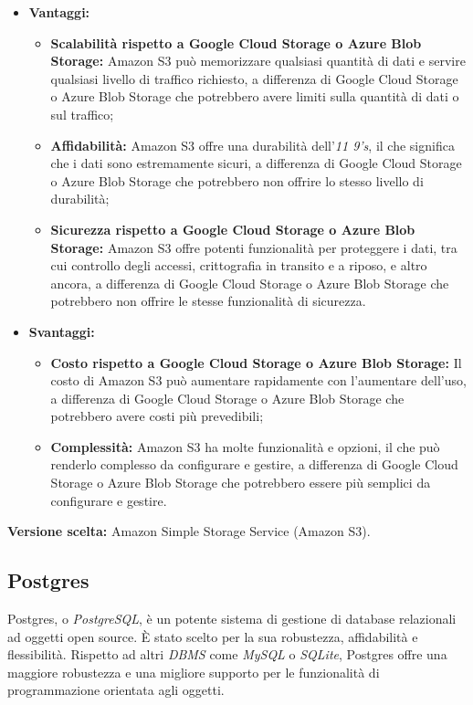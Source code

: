 \documentclass[10pt, a4paper]{article}
\begin{document}
\begin{itemize}
\item \textbf{Vantaggi:}
\begin{itemize}
\item \textbf{Scalabilità rispetto a Google Cloud Storage o Azure Blob Storage:} Amazon S3 può memorizzare qualsiasi quantità di dati e servire qualsiasi livello di traffico richiesto, a differenza di Google Cloud Storage o Azure Blob Storage che potrebbero avere limiti sulla quantità di dati o sul traffico;
\item \textbf{Affidabilità:} Amazon S3 offre una durabilità dell'\textit{11 9's\pg}, il che significa che i dati sono estremamente sicuri, a differenza di Google Cloud Storage o Azure Blob Storage che potrebbero non offrire lo stesso livello di durabilità;
\item \textbf{Sicurezza rispetto a Google Cloud Storage o Azure Blob Storage:} Amazon S3 offre potenti funzionalità per proteggere i dati, tra cui controllo degli accessi, crittografia in transito e a riposo, e altro ancora, a differenza di Google Cloud Storage o Azure Blob Storage che potrebbero non offrire le stesse funzionalità di sicurezza.
\end{itemize}
\item \textbf{Svantaggi:}
\begin{itemize}
\item \textbf{Costo rispetto a Google Cloud Storage o Azure Blob Storage:} Il costo di Amazon S3 può aumentare rapidamente con l'aumentare dell'uso, a differenza di Google Cloud Storage o Azure Blob Storage che potrebbero avere costi più prevedibili;
\item \textbf{Complessità:} Amazon S3 ha molte funzionalità e opzioni, il che può renderlo complesso da configurare e gestire, a differenza di Google Cloud Storage o Azure Blob Storage che potrebbero essere più semplici da configurare e gestire.
\end{itemize}
\end{itemize}
\textbf{Versione scelta:} Amazon Simple Storage Service (Amazon S3).

\subsection{Postgres}
Postgres, o \textit{PostgreSQL\pg}, è un potente sistema di gestione di database relazionali ad oggetti open source. È stato scelto per la sua robustezza, affidabilità e flessibilità. Rispetto ad altri \textit{DBMS\pg} come \textit{MySQL\pg} o \textit{SQLite\pg}, Postgres offre una maggiore robustezza e una migliore supporto per le funzionalità di programmazione orientata agli oggetti.
\end{document}
